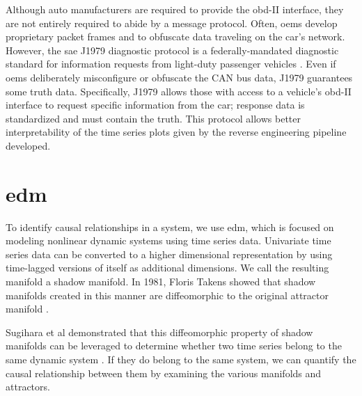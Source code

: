 \documentclass[12pt]{article}
\begin{document}
Although auto manufacturers are required to provide the \ac{obd}-II interface, they are not entirely required to abide by a message protocol. Often, \acp{oem} develop proprietary packet frames and to obfuscate data traveling on the car's network. However, the \ac{sae} J1979 diagnostic protocol is a federally-mandated diagnostic standard for information requests from light-duty passenger vehicles \cite{SAE2017}. Even if \acp{oem} deliberately misconfigure or obfuscate the CAN bus data, J1979 guarantees some truth data. Specifically, J1979 allows those with access to a vehicle's \ac{obd}-II interface to request specific information from the car; response data is standardized and must contain the truth. This protocol allows better interpretability of the time series plots given by the reverse engineering pipeline \cite{Stone2018} developed.

\section*{\acf{edm}}

To identify causal relationships in a system, we use \ac{edm}, which is focused on modeling nonlinear dynamic systems using time series data. Univariate time series data can be converted to a higher dimensional representation by using time-lagged versions of itself as additional dimensions. We call the resulting manifold a shadow manifold. In 1981, Floris Takens showed that shadow manifolds created in this manner are diffeomorphic to the original attractor manifold \cite{Takens1981}.

Sugihara et al demonstrated that this diffeomorphic property of shadow manifolds can be leveraged to determine whether two time series belong to the same dynamic system \cite{SugiharaLab2019}. If they do belong to the same system, we can quantify the causal relationship between them by examining the various manifolds and attractors.



\end{document}
